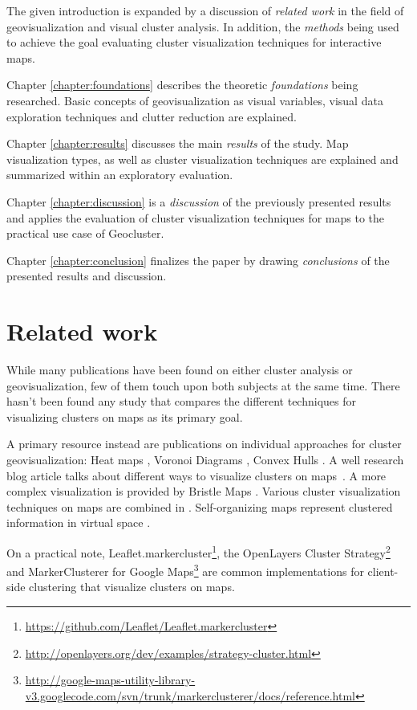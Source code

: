 The given introduction is expanded by a discussion of \textit{related work} in the field of geovisualization and visual cluster analysis. In addition, the \textit{methods} being used to achieve the goal evaluating cluster visualization techniques for interactive maps.

Chapter \ref{chapter:foundations} describes the theoretic \textit{foundations} being researched. Basic concepts of geovisualization as visual variables, visual data exploration techniques and clutter reduction are explained.

Chapter \ref{chapter:results} discusses the main \textit{results} of the study. Map visualization types, as well as cluster visualization techniques are explained and summarized within an exploratory evaluation.

Chapter \ref{chapter:discussion} is a \textit{discussion} of the previously presented results and applies the evaluation of cluster visualization techniques for maps to the practical use case of Geocluster.

Chapter \ref{chapter:conclusion} finalizes the paper by drawing \textit{conclusions} of the presented results and discussion.


\section{Related work}

While many publications have been found on either cluster analysis or geovisualization, few of them touch upon both subjects at the same time. There hasn't been found any study that compares the different techniques for visualizing clusters on maps as its primary goal.

A primary resource instead are publications on individual approaches for cluster geovisualization: 
Heat maps \cite{geotree, hotmap}, Voronoi Diagrams \cite{Delort10vis, voromap}, Convex Hulls \cite{Cristani08geoimagemaps}. A well research blog article talks about different ways to visualize clusters on maps~\cite{web:clustering-google}. A more complex visualization is provided by Bristle Maps \cite{bristle}. Various cluster visualization techniques on maps are combined in \cite{andrienko2012sca}. Self-organizing maps represent clustered information in virtual space \cite{som}.

On a practical note, Leaflet.markercluster\footnote{\url{https://github.com/Leaflet/Leaflet.markercluster}}, the OpenLayers Cluster Strategy\footnote{\url{http://openlayers.org/dev/examples/strategy-cluster.html}} and MarkerClusterer for Google Maps\footnote{\url{http://google-maps-utility-library-v3.googlecode.com/svn/trunk/markerclusterer/docs/reference.html}} are common implementations for client-side clustering that visualize clusters on maps.

